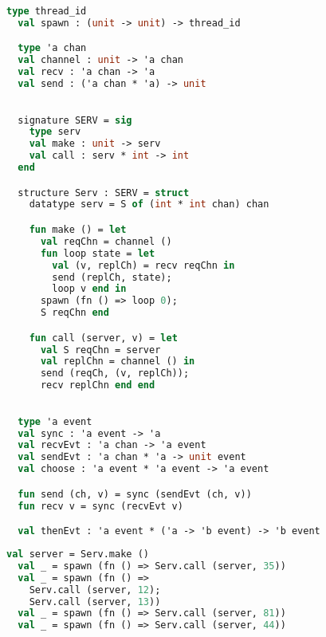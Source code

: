 \documentclass{article}
\begin{document}
\begin{lstlisting}[language=ML, style=codestyle1]
  type thread_id
  val spawn : (unit -> unit) -> thread_id

  type 'a chan
  val channel : unit -> 'a chan
  val recv : 'a chan -> 'a
  val send : ('a chan * 'a) -> unit
  \end{lstlisting}

\begin{lstlisting}[language=ML, style=codestyle1]

  signature SERV = sig 
    type serv
    val make : unit -> serv
    val call : serv * int -> int
  end

  structure Serv : SERV = struct 
    datatype serv = S of (int * int chan) chan 

    fun make () = let 
      val reqChn = channel ()
      fun loop state = let
        val (v, replCh) = recv reqChn in 
        send (replCh, state);
        loop v end in
      spawn (fn () => loop 0);
      S reqChn end 

    fun call (server, v) = let 
      val S reqChn = server
      val replChn = channel () in 
      send (reqCh, (v, replCh));
      recv replChn end end

  \end{lstlisting}

\begin{lstlisting}[language=ML, style=codestyle1]

  type 'a event
  val sync : 'a event -> 'a
  val recvEvt : 'a chan -> 'a event
  val sendEvt : 'a chan * 'a -> unit event
  val choose : 'a event * 'a event -> 'a event

  fun send (ch, v) = sync (sendEvt (ch, v))
  fun recv v = sync (recvEvt v)

  val thenEvt : 'a event * ('a -> 'b event) -> 'b event

  \end{lstlisting}

\begin{lstlisting}[language=ML, style=codestyle1]
  val server = Serv.make ()
  val _ = spawn (fn () => Serv.call (server, 35))
  val _ = spawn (fn () => 
    Serv.call (server, 12); 
    Serv.call (server, 13))
  val _ = spawn (fn () => Serv.call (server, 81))
  val _ = spawn (fn () => Serv.call (server, 44))
  \end{lstlisting}
\end{document}
